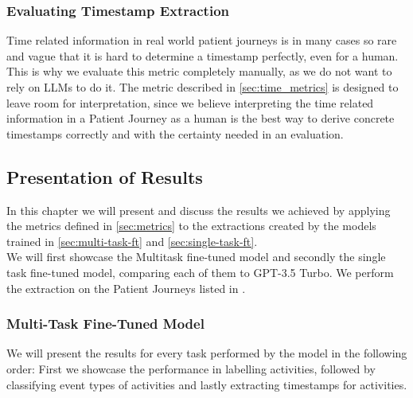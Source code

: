 \subsubsection{Evaluating Timestamp Extraction}\label{sec:eval_time}
Time related information in real world patient journeys is in many cases so rare and vague that it is hard to determine a timestamp perfectly, even for a human. This is why we evaluate this metric completely manually, as we do not want to rely on LLMs to do it. The metric described in \autoref{sec:time_metrics} is designed to leave room for interpretation, since we believe interpreting the time related information in a Patient Journey as a human is the best way to derive concrete timestamps correctly and with the certainty needed in an evaluation.

\subsection{Presentation of Results}\label{sec:results}
In this chapter we will present and discuss the results we achieved by applying the metrics defined in \autoref{sec:metrics} to the extractions created by the models trained in \autoref{sec:multi-task-ft} and \autoref{sec:single-task-ft}.\\
We will first showcase the Multitask fine-tuned model and secondly the single task fine-tuned model, comparing each of them to GPT-3.5 Turbo. We perform the extraction on the Patient Journeys listed in .

\subsubsection{Multi-Task Fine-Tuned Model}\label{sec_eval_multi}
We will present the results for every task performed by the model in the following order: First we showcase the performance in labelling activities, followed by classifying event types of activities and lastly extracting timestamps for activities.

